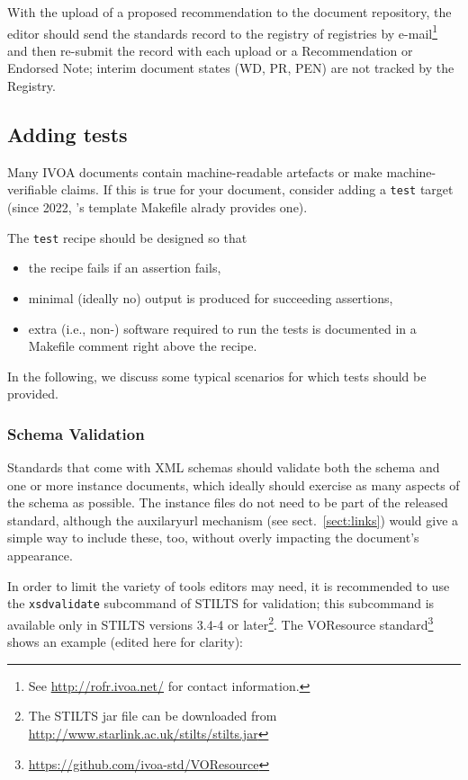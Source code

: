 \documentclass[11pt,a4paper]{ivoa}
\begin{document}
With the upload of a proposed recommendation to the document repository,
the editor should send the standards record to the registry of
registries by e-mail\footnote{See \url{http://rofr.ivoa.net/} for
contact information.} and then re-submit the record with each upload or
a Recommendation or Endorsed Note; interim document states (WD, PR, PEN)
are not tracked by the Registry.


\subsection{Adding tests}
\label{sect:tests}

Many IVOA documents contain machine-readable artefacts or make
machine-verifiable claims.  If this is true for your document, consider
adding a \verb|test| target (since 2022, \ivoatex's template Makefile
alrady provides one).

The \verb|test| recipe should be designed so that

\begin{itemize}
\item the recipe fails if an assertion fails,
\item minimal (ideally no) output is produced for succeeding assertions,
\item extra (i.e., non-\ivoatex) software required to run the tests is
documented in a Makefile comment right above the recipe.
\end{itemize}

In the following, we discuss some typical scenarios for which tests
should be provided.

\subsubsection{Schema Validation}

Standards that come with XML schemas should validate both the schema and
one or more instance documents, which ideally should exercise as many
aspects of the schema as possible.  The instance files do not need to be
part of the released standard, although the auxilaryurl mechanism (see
sect.~\ref{sect:links}) would give a simple way to include these, too,
without overly impacting the document's appearance.

In order to limit the variety of tools editors may need, it is
recommended to use the \verb|xsdvalidate| subcommand of STILTS
\citep{2006ASPC..351..666T} for validation; this subcommand is available
only in STILTS versions 3.4-4 or later\footnote{The STILTS jar file can be
downloaded from \url{http://www.starlink.ac.uk/stilts/stilts.jar}}.
The VOResource
standard\footnote{\url{https://github.com/ivoa-std/VOResource}} shows an
example (edited here for clarity):
\end{document}
